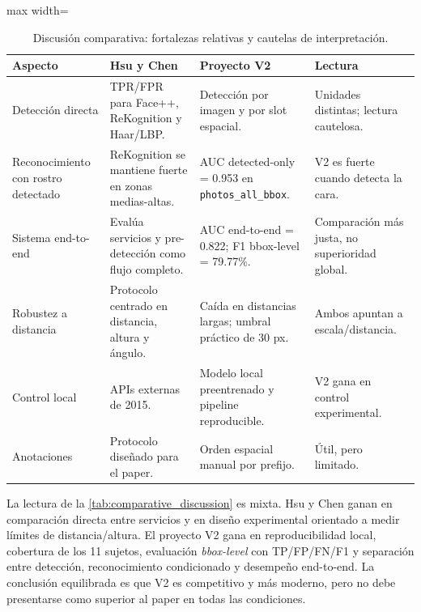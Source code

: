 \documentclass[11pt]{article}
\renewcommand{\arraystretch}{1.25}
\begin{document}
\begin{table}[H]
\centering
\caption{Discusi\'on comparativa: fortalezas relativas y cautelas de interpretaci\'on.}
\label{tab:comparative_discussion}
{\small
\setlength{\tabcolsep}{4pt}
\renewcommand{\arraystretch}{1.15}
\begin{adjustbox}{max width=\textwidth}
\begin{tabular}{>{\raggedright\arraybackslash}p{}
                >{\raggedright\arraybackslash}p{}
                >{\raggedright\arraybackslash}p{}
                >{\raggedright\arraybackslash}p{}}
\toprule
Aspecto & Hsu y Chen & Proyecto V2 & Lectura \\
\midrule
Detecci\'on directa & TPR/FPR para Face++, ReKognition y Haar/LBP. & Detecci\'on por imagen y por slot espacial. & Unidades distintas; lectura cautelosa. \\
Reconocimiento con rostro detectado & ReKognition se mantiene fuerte en zonas medias-altas. & AUC detected-only = 0.953 en \texttt{photos\_all\_bbox}. & V2 es fuerte cuando detecta la cara. \\
Sistema end-to-end & Eval\'ua servicios y pre-detecci\'on como flujo completo. & AUC end-to-end = 0.822; F1 bbox-level = 79.77\%. & Comparaci\'on m\'as justa, no superioridad global. \\
Robustez a distancia & Protocolo centrado en distancia, altura y \'angulo. & Ca\'ida en distancias largas; umbral pr\'actico de 30 px. & Ambos apuntan a escala/distancia. \\
Control local & APIs externas de 2015. & Modelo local preentrenado y pipeline reproducible. & V2 gana en control experimental. \\
Anotaciones & Protocolo dise\~nado para el paper. & Orden espacial manual por prefijo. & \'Util, pero limitado. \\
\bottomrule
\end{tabular}
\end{adjustbox}
}
\end{table}

La lectura de la \autoref{tab:comparative_discussion} es mixta. Hsu y Chen ganan en comparaci\'on directa entre servicios y en dise\~no experimental orientado a medir l\'imites de distancia/altura. El proyecto V2 gana en reproducibilidad local, cobertura de los 11 sujetos, evaluaci\'on \textit{bbox-level} con TP/FP/FN/F1 y separaci\'on entre detecci\'on, reconocimiento condicionado y desempe\~no end-to-end. La conclusi\'on equilibrada es que V2 es competitivo y m\'as moderno, pero no debe presentarse como superior al paper en todas las condiciones.
\end{document}

